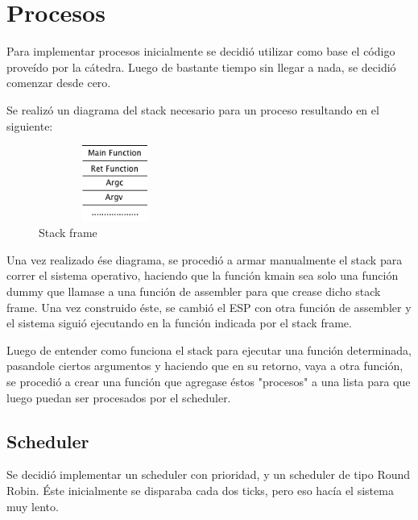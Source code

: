 \documentclass[english]{article}
\begin{document}
\maketitle
\newpage

\setcounter{page}{1} %
\tableofcontents
\newpage

\section{Procesos}

Para implementar procesos inicialmente se decidió utilizar como base el código proveído por la cátedra. Luego de bastante tiempo sin llegar a nada, se decidió comenzar desde cero.

Se realizó un diagrama del stack necesario para un proceso resultando en el siguiente:

\begin{figure}[H]
\begin{center}
\includegraphics[width=5cm,height=2.5cm,keepaspectratio]{stack}

\caption{Stack frame}
\end{center}
\end{figure}

Una vez realizado ése diagrama, se procedió a armar manualmente el stack para correr el sistema operativo, haciendo que la función kmain sea solo una función dummy que llamase a una función de assembler para que crease dicho stack frame. Una vez construido éste, se cambió el ESP con otra función de assembler y el sistema siguió ejecutando en la función indicada por el stack frame.

Luego de entender como funciona el stack para ejecutar una función determinada, pasandole ciertos argumentos y haciendo que en su retorno, vaya a otra función, se procedió a crear una función que agregase éstos "procesos" a una lista para que luego puedan ser procesados por el scheduler.

\subsection{Scheduler}
Se decidió implementar un scheduler con prioridad, y un scheduler de tipo Round Robin.
Éste inicialmente se disparaba cada dos ticks, pero eso hacía el sistema muy lento.
\end{document}
